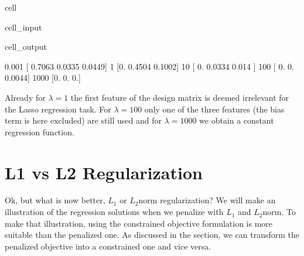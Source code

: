\documentclass[letterpaper,10pt,english]{jupyterBook}
\begin{document}
\begin{sphinxuseclass}{cell}\begin{sphinxVerbatimInput}

\begin{sphinxuseclass}{cell_input}
\begin{sphinxVerbatim}[commandchars=\\\{\}]
   \PYG{p}{[}  \PYG{p}{]}
        
\end{sphinxVerbatim}

\end{sphinxuseclass}\end{sphinxVerbatimInput}
\begin{sphinxVerbatimOutput}

\begin{sphinxuseclass}{cell_output}
\begin{sphinxVerbatim}[commandchars=\\\{\}]
0.001 	 [ 0.7063  0.0335 \PYGZhy{}0.0449]
1 	 [\PYGZhy{}0.      0.4504 \PYGZhy{}0.1002]
10 	 [ 0.      0.0334 \PYGZhy{}0.014 ]
100 	 [ 0.     \PYGZhy{}0.     \PYGZhy{}0.0044]
1000 	 [\PYGZhy{}0. \PYGZhy{}0. \PYGZhy{}0.]
\end{sphinxVerbatim}

\end{sphinxuseclass}\end{sphinxVerbatimOutput}

\end{sphinxuseclass}
\sphinxAtStartPar
Already for \(\lambda=1\) the first feature of the design matrix is deemed irrelevant for the Lasso regression task. For \(\lambda=100\) only one of the three features (the bias term is here excluded) are still used and for \(\lambda=1000\) we obtain a constant regression function.

\sphinxstepscope


\section{L1 vs L2 Regularization}
\label{\detokenize{regression_L1vsL2:l1-vs-l2-regularization}}\label{\detokenize{regression_L1vsL2::doc}}
\sphinxAtStartPar
Ok, but what is now better, \(L_1\)\sphinxhyphen{} or \(L_2\)\sphinxhyphen{}norm regularization? We will make an illustration of the regression solutions when we penalize with \(L_1\)\sphinxhyphen{} and \(L_2\)\sphinxhyphen{}norm. To make that illustration, using the constrained objective formulation is more suitable than the penalized one. As discussed in the  section, we can transform the penalized objective into a constrained one and vice versa.
\end{document}
